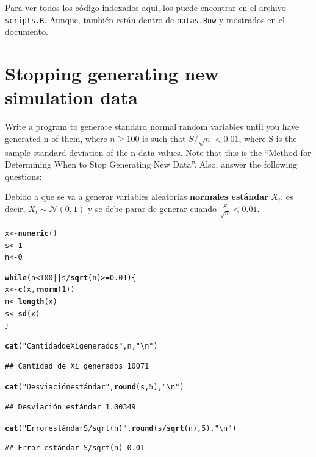 \documentclass[12pt]{article}\usepackage[]{graphicx}\usepackage[]{xcolor}
\makeatletter
\newcommand{\hlnum}[1]{\textcolor[rgb]{0.686,0.059,0.569}{#1}}%
\newcommand{\hlsng}[1]{\textcolor[rgb]{0.192,0.494,0.8}{#1}}%
\newcommand{\hlopt}[1]{\textcolor[rgb]{0,0,0}{#1}}%
\newcommand{\hldef}[1]{\textcolor[rgb]{0.345,0.345,0.345}{#1}}%
\newcommand{\hlkwa}[1]{\textcolor[rgb]{0.161,0.373,0.58}{\textbf{#1}}}%
\newcommand{\hlkwb}[1]{\textcolor[rgb]{0.69,0.353,0.396}{#1}}%
\newcommand{\hlkwd}[1]{\textcolor[rgb]{0.737,0.353,0.396}{\textbf{#1}}}%
\newenvironment{kframe}{%
 \def\at@end@of@kframe{}%
 \ifinner\ifhmode%
  \def\at@end@of@kframe{\end{minipage}}%
  \begin{minipage}{\columnwidth}%
 \fi\fi%
 \def\FrameCommand##1{\hskip\@totalleftmargin \hskip-\fboxsep
 \colorbox{shadecolor}{##1}\hskip-\fboxsep
     \hskip-\linewidth \hskip-\@totalleftmargin \hskip\columnwidth}%
 \MakeFramed {\advance\hsize-\width
   \@totalleftmargin\z@ \linewidth\hsize
   \@setminipage}}%
 {\par\unskip\endMakeFramed%
 \at@end@of@kframe}
\newenvironment{knitrout}{}{} %
\makeatother
\begin{document}
Para ver todos los código indexados aquí, los puede encontrar en el archivo \texttt{scripts.R}. Aunque, también están dentro de \texttt{notas.Rnw} y mostrados en el documento.


\section{Stopping generating new simulation data}

Write a program to generate standard normal random variables until you have generated n of them, where $n \geq 100$ is such that $S/\sqrt{n} < 0.01$, where S is the sample standard deviation of the n data values. Note that this is the ``Method for Determining When to Stop Generating New Data''. Also, answer the following questions:



Debido a que se va a generar variables aleatorias \textbf{normales estándar} $X_{i}$, es decir, $X_{i} \sim \mathcal{N}(0, 1)$ y se debe parar de generar cuando $\frac{S}{\sqrt{n}} < 0.01$.

\begin{knitrout}
\color{fgcolor}\begin{kframe}
\begin{alltt}
\hldef{x} \hlkwb{<-} \hlkwd{numeric}\hldef{()}
\hldef{s} \hlkwb{<-} \hlnum{1}
\hldef{n} \hlkwb{<-} \hlnum{0}

\hlkwa{while}\hldef{(n} \hlopt{<} \hlnum{100} \hlopt{||} \hldef{s} \hlopt{/} \hlkwd{sqrt}\hldef{(n)} \hlopt{>=} \hlnum{0.01}\hldef{) \{}
  \hldef{x} \hlkwb{<-} \hlkwd{c}\hldef{(x,} \hlkwd{rnorm}\hldef{(}\hlnum{1}\hldef{))}
  \hldef{n} \hlkwb{<-} \hlkwd{length}\hldef{(x)}
  \hldef{s} \hlkwb{<-} \hlkwd{sd}\hldef{(x)}
\hldef{\}}

\hlkwd{cat}\hldef{(}\hlsng{"Cantidad de Xi generados"}\hldef{, n,} \hlsng{"\textbackslash{}n"}\hldef{)}
\end{alltt}
\begin{verbatim}
## Cantidad de Xi generados 10071
\end{verbatim}
\begin{alltt}
\hlkwd{cat}\hldef{(}\hlsng{"Desviación estándar"}\hldef{,} \hlkwd{round}\hldef{(s,} \hlnum{5}\hldef{),} \hlsng{"\textbackslash{}n"}\hldef{)}
\end{alltt}
\begin{verbatim}
## Desviación estándar 1.00349
\end{verbatim}
\begin{alltt}
\hlkwd{cat}\hldef{(}\hlsng{"Error estándar S/sqrt(n)"}\hldef{,} \hlkwd{round}\hldef{(s}\hlopt{/}\hlkwd{sqrt}\hldef{(n),} \hlnum{5}\hldef{),} \hlsng{"\textbackslash{}n"}\hldef{)}
\end{alltt}
\begin{verbatim}
## Error estándar S/sqrt(n) 0.01
\end{verbatim}
\end{kframe}
\end{knitrout}
\end{document}
